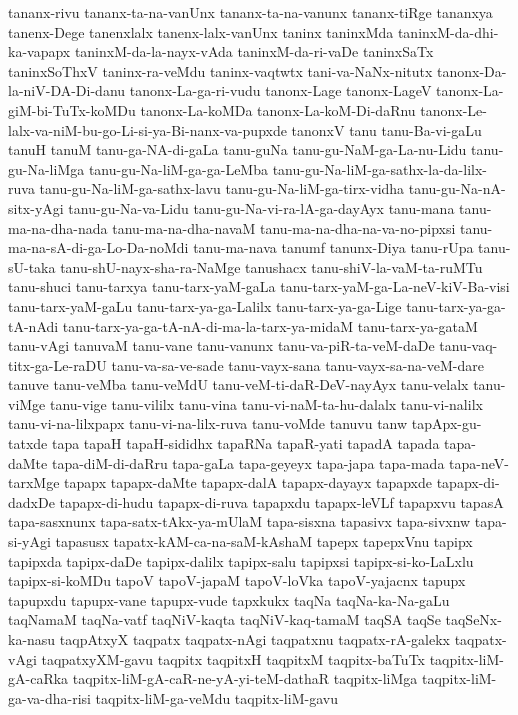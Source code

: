 {tananx-rivu
tananx-ta-na-vanUnx
tananx-ta-na-vanunx
tananx-tiRge
tananxya
tanenx-Dege
tanenxlalx
tanenx-lalx-vanUnx
taninx
taninxMda
taninxM-da-dhi-ka-vapapx
taninxM-da-la-nayx-vAda
taninxM-da-ri-vaDe
taninxSaTx
taninxSoThxV
taninx-ra-veMdu
taninx-vaqtwtx
tani-va-NaNx-nitutx
tanonx-Da-la-niV-DA-Di-danu
tanonx-La-ga-ri-vudu
tanonx-Lage
tanonx-LageV
tanonx-La-giM-bi-TuTx-koMDu
tanonx-La-koMDa
tanonx-La-koM-Di-daRnu
tanonx-Le-lalx-va-niM-bu-go-Li-si-ya-Bi-nanx-va-pupxde
tanonxV
tanu
tanu-Ba-vi-gaLu
tanuH
tanuM
tanu-ga-NA-di-gaLa
tanu-guNa
tanu-gu-NaM-ga-La-nu-Lidu
tanu-gu-Na-liMga
tanu-gu-Na-liM-ga-ga-LeMba
tanu-gu-Na-liM-ga-sathx-la-da-lilx-ruva
tanu-gu-Na-liM-ga-sathx-lavu
tanu-gu-Na-liM-ga-tirx-vidha
tanu-gu-Na-nA-sitx-yAgi
tanu-gu-Na-va-Lidu
tanu-gu-Na-vi-ra-lA-ga-dayAyx
tanu-mana
tanu-ma-na-dha-nada
tanu-ma-na-dha-navaM
tanu-ma-na-dha-na-va-no-pipxsi
tanu-ma-na-sA-di-ga-Lo-Da-noMdi
tanu-ma-nava
tanumf
tanunx-Diya
tanu-rUpa
tanu-sU-taka
tanu-shU-nayx-sha-ra-NaMge
tanushacx
tanu-shiV-la-vaM-ta-ruMTu
tanu-shuci
tanu-tarxya
tanu-tarx-yaM-gaLa
tanu-tarx-yaM-ga-La-neV-kiV-Ba-visi
tanu-tarx-yaM-gaLu
tanu-tarx-ya-ga-Lalilx
tanu-tarx-ya-ga-Lige
tanu-tarx-ya-ga-tA-nAdi
tanu-tarx-ya-ga-tA-nA-di-ma-la-tarx-ya-midaM
tanu-tarx-ya-gataM
tanu-vAgi
tanuvaM
tanu-vane
tanu-vanunx
tanu-va-piR-ta-veM-daDe
tanu-vaq-titx-ga-Le-raDU
tanu-va-sa-ve-sade
tanu-vayx-sana
tanu-vayx-sa-na-veM-dare
tanuve
tanu-veMba
tanu-veMdU
tanu-veM-ti-daR-DeV-nayAyx
tanu-velalx
tanu-viMge
tanu-vige
tanu-vililx
tanu-vina
tanu-vi-naM-ta-hu-dalalx
tanu-vi-nalilx
tanu-vi-na-lilxpapx
tanu-vi-na-lilx-ruva
tanu-voMde
tanuvu
tanw
tapApx-gu-tatxde
tapa
tapaH
tapaH-sididhx
tapaRNa
tapaR-yati
tapadA
tapada
tapa-daMte
tapa-diM-di-daRru
tapa-gaLa
tapa-geyeyx
tapa-japa
tapa-mada
tapa-neV-tarxMge
tapapx
tapapx-daMte
tapapx-dalA
tapapx-dayayx
tapapxde
tapapx-di-dadxDe
tapapx-di-hudu
tapapx-di-ruva
tapapxdu
tapapx-leVLf
tapapxvu
tapasA
tapa-sasxnunx
tapa-satx-tAkx-ya-mUlaM
tapa-sisxna
tapasivx
tapa-sivxnw
tapa-si-yAgi
tapasusx
tapatx-kAM-ca-na-saM-kAshaM
tapepx
tapepxVnu
tapipx
tapipxda
tapipx-daDe
tapipx-dalilx
tapipx-salu
tapipxsi
tapipx-si-ko-LaLxlu
tapipx-si-koMDu
tapoV
tapoV-japaM
tapoV-loVka
tapoV-yajacnx
tapupx
tapupxdu
tapupx-vane
tapupx-vude
tapxkukx
taqNa
taqNa-ka-Na-gaLu
taqNamaM
taqNa-vatf
taqNiV-kaqta
taqNiV-kaq-tamaM
taqSA
taqSe
taqSeNx-ka-nasu
taqpAtxyX
taqpatx
taqpatx-nAgi
taqpatxnu
taqpatx-rA-galekx
taqpatx-vAgi
taqpatxyXM-gavu
taqpitx
taqpitxH
taqpitxM
taqpitx-baTuTx
taqpitx-liM-gA-caRka
taqpitx-liM-gA-caR-ne-yA-yi-teM-dathaR
taqpitx-liMga
taqpitx-liM-ga-va-dha-risi
taqpitx-liM-ga-veMdu
taqpitx-liM-gavu
}
